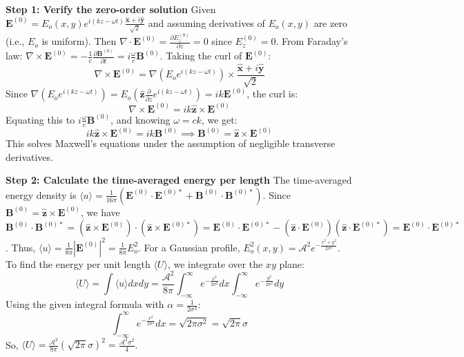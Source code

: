 \begin{solution}
\textbf{Step 1: Verify the zero-order solution}
Given $\mathbf{E}^{(0)} = E_o(x,y) e^{i(kz - \omega t)} \frac{\hat{\mathbf{x}} + i\hat{\mathbf{y}}}{\sqrt{2}}$ and assuming derivatives of $E_o(x,y)$ are zero (i.e., $E_o$ is uniform).
Then $\nabla \cdot \mathbf{E}^{(0)} = \frac{\partial E^{(0)}_z}{\partial z} = 0$ since $E^{(0)}_z = 0$.
From Faraday's law: $\nabla \times \mathbf{E}^{(0)} = -\frac{1}{c} \frac{\partial \mathbf{B}^{(0)}}{\partial t} = i\frac{\omega}{c} \mathbf{B}^{(0)}$.
Taking the curl of $\mathbf{E}^{(0)}$:
\[ \nabla \times \mathbf{E}^{(0)} = \nabla \left( E_o e^{i(kz - \omega t)} \right) \times \frac{\hat{\mathbf{x}} + i\hat{\mathbf{y}}}{\sqrt{2}} \]
Since $\nabla (E_o e^{i(kz - \omega t)}) = E_o (\hat{\mathbf{z}} \frac{\partial}{\partial z} e^{i(kz - \omega t)}) = i k \mathbf{E}^{(0)}$, the curl is:
\[ \nabla \times \mathbf{E}^{(0)} = i k \hat{\mathbf{z}} \times \mathbf{E}^{(0)} \]
Equating this to $i\frac{\omega}{c} \mathbf{B}^{(0)}$, and knowing $\omega = ck$, we get:
\[ i k \hat{\mathbf{z}} \times \mathbf{E}^{(0)} = i k \mathbf{B}^{(0)} \implies \mathbf{B}^{(0)} = \hat{\mathbf{z}} \times \mathbf{E}^{(0)} \]
This solves Maxwell's equations under the assumption of negligible transverse derivatives.

\textbf{Step 2: Calculate the time-averaged energy per length}
The time-averaged energy density is $\langle u \rangle = \frac{1}{16\pi} (\mathbf{E}^{(0)} \cdot \mathbf{E}^{(0)*} + \mathbf{B}^{(0)} \cdot \mathbf{B}^{(0)*})$.
Since $\mathbf{B}^{(0)} = \hat{\mathbf{z}} \times \mathbf{E}^{(0)}$, we have $\mathbf{B}^{(0)} \cdot \mathbf{B}^{(0)*} = (\hat{\mathbf{z}} \times \mathbf{E}^{(0)}) \cdot (\hat{\mathbf{z}} \times \mathbf{E}^{(0)*}) = \mathbf{E}^{(0)} \cdot \mathbf{E}^{(0)*} - (\hat{\mathbf{z}} \cdot \mathbf{E}^{(0)})(\hat{\mathbf{z}} \cdot \mathbf{E}^{(0)*}) = \mathbf{E}^{(0)} \cdot \mathbf{E}^{(0)*}$.
Thus, $\langle u \rangle = \frac{1}{8\pi} |\mathbf{E}^{(0)}|^2 = \frac{1}{8\pi} E_o^2$.
For a Gaussian profile, $E_o^2(x,y) = \mathcal{A}^2 e^{-\frac{x^2+y^2}{2\sigma^2}}$.
To find the energy per unit length $\langle U \rangle$, we integrate over the $xy$ plane:
\[ \langle U \rangle = \int \langle u \rangle dx dy = \frac{\mathcal{A}^2}{8\pi} \int_{-\infty}^\infty e^{-\frac{x^2}{2\sigma^2}} dx \int_{-\infty}^\infty e^{-\frac{y^2}{2\sigma^2}} dy \]
Using the given integral formula with $\alpha = \frac{1}{2\sigma^2}$:
\[ \int_{-\infty}^\infty e^{-\frac{x^2}{2\sigma^2}} dx = \sqrt{2\pi\sigma^2} = \sqrt{2\pi} \sigma \]
So, $\langle U \rangle = \frac{\mathcal{A}^2}{8\pi} (\sqrt{2\pi}\sigma)^2 = \frac{\mathcal{A}^2 \sigma^2}{4}$.


\end{solution}
